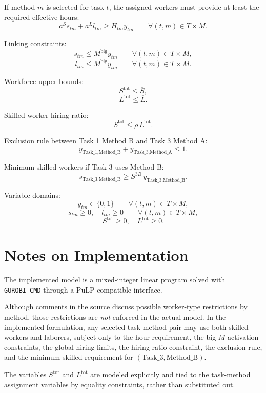 If method \(m\) is selected for task \(t\), the assigned workers must provide at least the required effective hours:
\[
a^S s_{tm} + a^L l_{tm} \ge H_{tm} y_{tm}
\qquad \forall (t,m)\in T\times M.
\]

Linking constraints:
\[
s_{tm}\le M^{\text{big}} y_{tm}
\qquad \forall (t,m)\in T\times M,
\]
\[
l_{tm}\le M^{\text{big}} y_{tm}
\qquad \forall (t,m)\in T\times M.
\]

Workforce upper bounds:
\[
S^{\text{tot}}\le \overline S,
\]
\[
L^{\text{tot}}\le \overline L.
\]

Skilled-worker hiring ratio:
\[
S^{\text{tot}}\le \rho\, L^{\text{tot}}.
\]

Exclusion rule between Task 1 Method B and Task 3 Method A:
\[
y_{\text{Task\_1},\text{Method\_B}} + y_{\text{Task\_3},\text{Method\_A}} \le 1.
\]

Minimum skilled workers if Task 3 uses Method B:
\[
s_{\text{Task\_3},\text{Method\_B}} \ge \underline S^{3B}\, y_{\text{Task\_3},\text{Method\_B}}.
\]

Variable domains:
\[
y_{tm}\in\{0,1\}
\qquad \forall (t,m)\in T\times M,
\]
\[
s_{tm}\ge 0,\quad l_{tm}\ge 0
\qquad \forall (t,m)\in T\times M,
\]
\[
S^{\text{tot}}\ge 0,\quad L^{\text{tot}}\ge 0.
\]

\section*{Notes on Implementation}

The implemented model is a mixed-integer linear program solved with \texttt{GUROBI\_CMD} through a PuLP-compatible interface.

Although comments in the source discuss possible worker-type restrictions by method, those restrictions are \emph{not} enforced in the actual model. In the implemented formulation, any selected task-method pair may use both skilled workers and laborers, subject only to the hour requirement, the big-\(M\) activation constraints, the global hiring limits, the hiring-ratio constraint, the exclusion rule, and the minimum-skilled requirement for \((\text{Task\_3},\text{Method\_B})\).

The variables \(S^{\text{tot}}\) and \(L^{\text{tot}}\) are modeled explicitly and tied to the task-method assignment variables by equality constraints, rather than substituted out.
